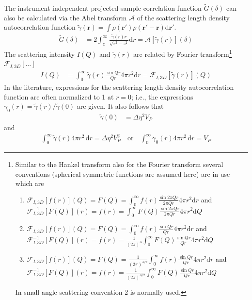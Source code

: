 The instrument independent projected sample correlation function $\tilde{G}(\delta)$ can also be calculated via the Abel transform $\mathcal{A}$ of the scattering length density autocorrelation function $\tilde{\gamma}(\mathbf{r})=\int \rho(\mathbf{r'})\rho(\mathbf{r'-r})\mathrm{d}\mathbf{r'}$.
\begin{align}
\tilde{G}(\delta) &= 2 \int_z^\infty \frac{\tilde{\gamma}(r) r}{\sqrt{r^2-z^2}} \mathrm{d}r = \mathcal{A}\left[\tilde{\gamma}(r)\right](\delta)
\end{align}
The scattering intensity $I(Q)$ and  $\tilde{\gamma}(r)$ are related by Fourier transform\footnote{\label{footnote:Fourier}Similar to the Hankel transform also for the Fourier transform several conventions (spherical symmetric functions are assumed here) are in use which are
\begin{enumerate}
\item $\mathcal{F}_{I,3D}[f(r)](Q)=F(Q)=\int_0^\infty f(r) \frac{\sin 2\pi Qr}{2\pi Qr}4\pi r^2\mathrm{d}r$ and \\ $\mathcal{F}_{I,3D}^{-1}[F(Q)](r)=f(r)=\int_0^\infty F(Q) \frac{\sin 2\pi Qr}{2\pi Qr}4\pi r^2\mathrm{d}Q$
\item $\mathcal{F}_{I,3D}[f(r)](Q)=F(Q)=\int_0^\infty f(r) \frac{\sin Qr}{Qr}4\pi r^2\mathrm{d}r$ and \\ $\mathcal{F}_{I,3D}^{-1}[F(Q)](r)=f(r)=\frac{1}{(2\pi)^3}\int_0^\infty F(Q) \frac{\sin Qr}{Qr}4\pi r^2\mathrm{d}Q$
\item $\mathcal{F}_{I,3D}[f(r)](Q)=F(Q)=\frac{1}{(2\pi)^{3/2}}\int_0^\infty f(r) \frac{\sin Qr}{ Qr}4\pi r^2\mathrm{d}r$ and \\ $\mathcal{F}_{I,3D}^{-1}[F(Q)](r)=f(r)=\frac{1}{(2\pi)^{3/2}}\int_0^\infty F(Q) \frac{\sin Qr}{Qr}4\pi r^2\mathrm{d}Q$
\end{enumerate}
In small angle scattering convention 2 is normally used.
} $\mathcal{F}_{I,3D}[\ldots]$
\begin{align}
I(Q) &= \int_0^\infty \tilde{\gamma}(r) \frac{\sin Qr}{Qr}4\pi r^2\mathrm{d}r =
\mathcal{F}_{I,3D}\left[\tilde{\gamma}(r)\right](Q)
\end{align}
In the literature, expressions for the scattering length density autocorrelation function are often normalized to 1 at $r=0$; i.e., the expressions $\gamma_0(r)=\tilde{\gamma}(r)/\tilde{\gamma}(0)$ are given. It also follows that
\begin{align}
\tilde{\gamma}(0)&=\Delta\eta^2 V_P
\end{align}
and
\begin{align} \label{eq:VolumeFromCorrelationfunction}
\int_0^\infty \tilde{\gamma}(r) 4\pi r^2 \, \mathrm{d}r =\Delta\eta^2 V_P^2 \quad \mbox{or} \quad  \int_0^\infty \gamma_0(r) 4\pi r^2 \, \mathrm{d}r = V_P
\end{align}
